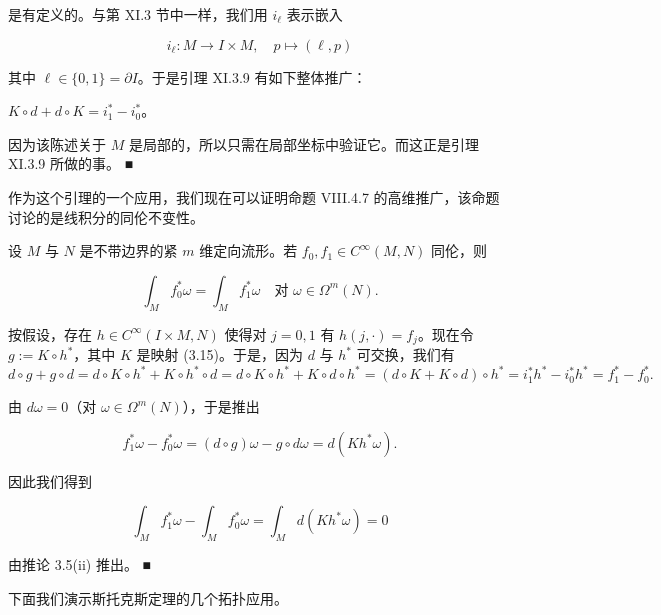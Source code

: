 是有定义的。与第 XI.3 节中一样，我们用 $ i_\ell $ 表示嵌入

\[
i_\ell : M\to I\times M,\quad p\mapsto(\ell,p)
\]

其中 $ \ell\in\{0,1\} = \partial I $。于是引理 XI.3.9 有如下整体推广：

\begin{lemma}

$ K\circ d + d\circ K = i_1^* - i_0^* $。

\proofhead
因为该陈述关于 $ M $ 是局部的，所以只需在局部坐标中验证它。而这正是引理 XI.3.9 所做的事。 \nobreak\hspace{0.35em}■
\end{lemma}

作为这个引理的一个应用，我们现在可以证明命题 VIII.4.7 的高维推广，该命题讨论的是线积分的同伦不变性。

\begin{theorem}

设 $ M $ 与 $ N $ 是不带边界的紧 $ m $ 维定向流形。若 $ f_0,f_1\in C^\infty(M,N) $ 同伦，则

\[
\int_M f_0^*\omega = \int_M f_1^*\omega \quad \text{对 } \omega\in\Omega^m(N) .
\]

\proofhead
按假设，存在 $ h\in C^\infty(I\times M,N) $ 使得对 $ j = 0,1 $ 有 $ h(j,\cdot) = f_j $。现在令 $ g := K\circ h^* $，其中 $ K $ 是映射 (3.15)。于是，因为 $ d $ 与 $ h^* $ 可交换，我们有
\[
d\circ g + g\circ d = d\circ K\circ h^* + K\circ h^*\circ d = d\circ K\circ h^* + K\circ d\circ h^* = (d\circ K + K\circ d)\circ h^* = i_1^*h^* - i_0^*h^* = f_1^* - f_0^*.
\]

由 $ d\omega = 0 $（对 $ \omega\in\Omega^m(N) $），于是推出

\[
f_1^*\omega - f_0^*\omega = (d\circ g)\omega - g\circ d\omega = d(Kh^*\omega) .
\]

因此我们得到

\[
\int_M f_1^*\omega - \int_M f_0^*\omega = \int_M d(Kh^*\omega) = 0
\]

由推论 3.5(ii) 推出。 \nobreak\hspace{0.35em}■

\end{theorem}

下面我们演示斯托克斯定理的几个拓扑应用。

